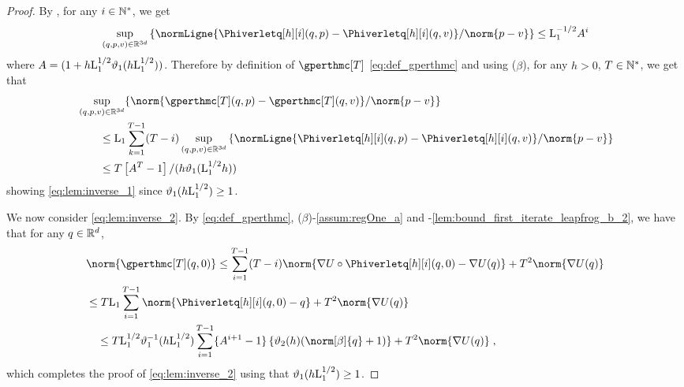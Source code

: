 \begin{proof}
By
, for any $i \in \mathbb{N}^{*}$, we get
\[
\sup_{(q,\p,v) \in \rset^{3d}} \defEns{ \normLigne{ \Phiverletq[h][i](q,\p) - \Phiverletq[h][i](q,v)} / \norm{\p-v} }
\leq \constzero^{-1/2} A^i
\]
where $A=(1+h \mathrm{L}_1^{1/2} \vartheta_1(h \mathrm{L}_1^{1/2} ))$.
Therefore by definition of $\gperthmc[T]$ \eqref{eq:def_gperthmc} and using  ($\beta$), for any $h >0$, $T \in \mathbb{N}^{*}$, we get that
\begin{align}
&  \sup_{(\q,\p,v) \in \rset^{3d}} \{ \norm{ \gperthmc[T](q,\p) - \gperthmc[T](q,v)} / \norm{\p-v} \} \\
&\qquad  \leq \constzero   \sum_{k=1}^{T-1} (T-i) \sup_{(q,\p,v) \in \rset^{3d}} \defEns{ \normLigne{ \Phiverletq[h][i](q,\p) - \Phiverletq[h][i](q,v)} / \norm{\p-v} }\\
& \qquad \leq    T \parentheseDeux{ A^{T} - 1 } /(h \vartheta_1(\constzero^{1/2} h)) \,
\end{align}
showing \eqref{eq:lem:inverse_1} since $\vartheta_1(h\mathrm{L}_1^{1/2}) \geq 1$.

We now consider \eqref{eq:lem:inverse_2}. By \eqref{eq:def_gperthmc}, ($\beta$)-\ref{assum:regOne_a} and -\ref{lem:bound_first_iterate_leapfrog_b_2}, we have that for any $q \in \mathbb{R}^d$,
\begin{align}
&  \norm{\gperthmc[T](q,0)}  \leq \sum_{i=1}^{T-1} (T-i)  \norm{ \nabla U \circ \Phiverletq[h][i](\q,0) - \nabla U(q)} + T^2 \norm{\nabla U(q)} \\
& \leq  T \constzero \sum_{i=1}^{T-1}  \norm{ \Phiverletq[h][i](\q,0) -q} + T^2 \norm{\nabla U(q)} \\
& \quad \leq T \constzero^{1/2} \vartheta_1^{-1} (h \constzero^{1/2}) \sum_{i=1}^{T-1}\{A^{i+1}-1\} \defEns{\vartheta_2(h) (\norm[\beta]{q} +1)}  + T^2 \norm{\nabla U(q)} \eqsp,
\end{align}
which completes the proof of \eqref{eq:lem:inverse_2} using that $\vartheta_1(h \mathrm{L}_1^{1/2}) \geq 1$.
\end{proof}

